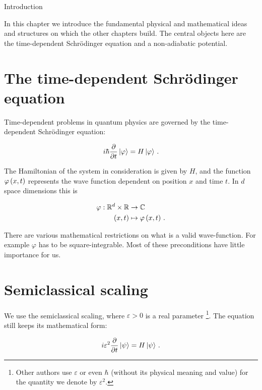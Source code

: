 \begin{chapter}{Introduction}
\label{ch:introduction}

In this chapter we introduce the fundamental physical and mathematical ideas and
structures on which the other chapters build. The central objects here are the
time-dependent Schrödinger equation and a non-adiabatic potential.


\section{The time-dependent Schrödinger equation}

Time-dependent problems in quantum physics are governed by the time-dependent
Schrödinger equation:

\begin{equation} \label{eq:basics_tdse_simple}
  i \hbar \frac{\partial}{\partial t} \Ket{\varphi} = H \Ket{\varphi} \,.
\end{equation}

The Hamiltonian of the system in consideration is given by $H$, and the function
$\varphi\left( x,t \right)$ represents the wave function dependent on position $x$ and
time $t$. In $d$ space dimensions this is

\begin{align*}
  \varphi : \mathbb{R}^d \times \mathbb{R} & \rightarrow \mathbb{C} \\
                       \left( x, t \right) & \mapsto \varphi\left( x,t \right) \,.
\end{align*}

There are various mathematical restrictions on what is a valid wave-function. For
example $\varphi$ has to be square-integrable. Most of these preconditions have
little importance for us.

\section{Semiclassical scaling}

We use the semiclassical scaling, where $\varepsilon > 0$ is a real parameter
\footnote{Other authors use $\varepsilon$ or even $\hbar$ (without its physical
meaning and value) for the quantity we denote by $\varepsilon^2$.}. The equation
still keeps its mathematical form:

\begin{equation} \label{eq:basics_tdse_semi}
  i \varepsilon^2 \frac{\partial}{\partial t} \Ket{\psi} = H \Ket{\psi} \,.
\end{equation}


\end{chapter}
